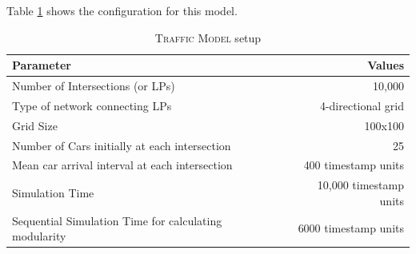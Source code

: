 \documentclass[11pt]{book}
\begin{document}
Table \ref{table:traffic_10k_config} shows the configuration for this model.

\begin{table}
    \centering
    \begin{tabular}{|| l | r ||}
        \hline
        Parameter                           &   Values\\ [0.5ex]
        \hline\hline
        Number of Intersections (or LPs)    &   10,000\\
        Type of network connecting LPs      &   4-directional grid\\
        Grid Size                           &   100x100\\
        Number of Cars initially at each intersection   &   25\\
        Mean car arrival interval at each intersection  &   400 timestamp units\\
        Simulation Time                     &   10,000 timestamp units\\
        Sequential Simulation Time for calculating modularity   &   6000 timestamp units\\
        \hline
    \end{tabular}
    \caption{\textsc{Traffic Model} setup}\label{table:traffic_10k_config}
\end{table}
\end{document}

